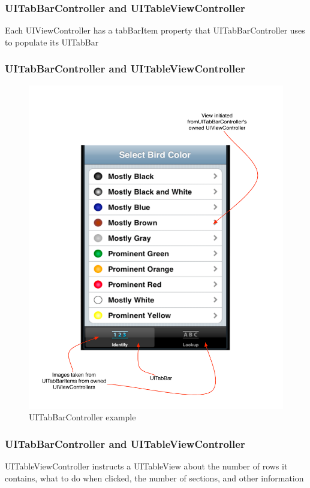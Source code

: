 \documentclass[10pt]{beamer}
\begin{document}
\begin{frame}[fragile]
  \frametitle{UITabBarController and UITableViewController}
  Each UIViewController has a tabBarItem property that UITabBarController uses to populate its UITabBar

\end{frame}

\begin{frame}[fragile]
  \frametitle{UITabBarController and UITableViewController}
  \begin{figure}[htb]
  \begin{center}
  
  \includegraphics[scale=0.3]{UIViewExample4.pdf}
              
  \caption{UITabBarController example}
  \end{center}
  \end{figure}

\end{frame}

\begin{frame}[fragile]
  \frametitle{UITabBarController and UITableViewController}
  UITableViewController instructs a UITableView about the number of rows it contains, what to do when clicked, the number of sections, and other information

\end{frame}
\end{document}
